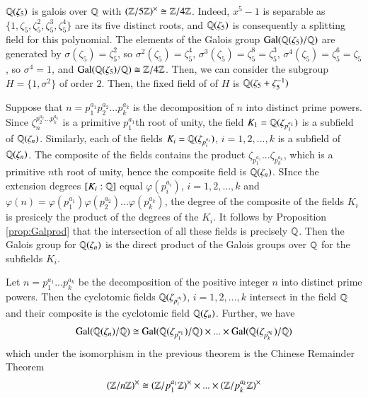 \documentclass[12pt, a4paper, oneside, openright, titlepage]{book}
\begin{document}
\begin{eg}
    $\mathbb Q(\zeta_5)$ is galois over $\mathbb Q$ with $(\mathbb Z/5\mathbb Z)^{\times} \cong \mathbb Z/4\mathbb Z$. Indeed, $x^5-1$ is separable as $\{1,\zeta_5,\zeta_5^2,\zeta_5^3,\zeta_5^4\}$ are its five distinct roots, and $\mathbb Q(\zeta_5)$ is consequently a splitting field for this polynomial. The elements of the Galois group $\text{Gal}(\mathbb Q(\zeta_5)/\mathbb Q)$ are generated by $\sigma(\zeta_5) = \zeta_5^2$, so $\sigma^2(\zeta_5) = \zeta_5^4$, $\sigma^3(\zeta_5) = \zeta_5^8 = \zeta_5^3$, $\sigma^4(\zeta_5) = \zeta_5^{6} = \zeta_5$, so $\sigma^4 = 1$, and $\text{Gal}(\mathbb Q(\zeta_5)/\mathbb Q) \cong \mathbb Z/4\mathbb Z$. Then, we can consider the subgroup $H = \{1,\sigma^2\}$ of order $2$. Then, the fixed field of of $H$ is $\mathbb Q(\zeta_5+\zeta_5^{-1})$
\end{eg}

Suppose that $n = p_1^{a_1}p_2^{a_2}...p_k^{a_k}$ is the decomposition of $n$ into distinct prime powers. Since $\zeta_n^{p_2^{a_2}...p_k^{a_k}}$ is a primitive $p_1^{a_1}$th root of unity, the field $K_1 = \mathbb Q(\zeta_{p_1^{a_1}})$ is a subfield of $\mathbb Q(\zeta_n)$. Similarly, each of the fields $K_i = \mathbb Q(\zeta_{p_i^{a_i}})$, $i = 1,2,...,k$ is a subfield of $\mathbb Q(\zeta_n)$. The composite of the fields contains the product $\zeta_{p_1^{a_1}}...\zeta_{p_k^{a_k}}$, which is a primitive $n$th root of unity, hence the composite field is $\mathbb Q(\zeta_n)$. SInce the extension degrees $[K_i:\mathbb Q]$ equal $\varphi(p_i^{a_i})$, $i=1,2,...,k$ and $\varphi(n) = \varphi(p_1^{a_1})\varphi(p_2^{a_2})...\varphi(p_k^{a_k})$, the degree of the composite of the fields $K_i$ is presicely the product of the degrees of the $K_i$. It follows by Proposition \ref{prop:Galprod} that the intersection of all these fields is precisely $\mathbb Q$. Then the Galois group for $\mathbb Q(\zeta_n)$ is the direct product of the Galois groups over $\mathbb Q$ for the subfields $K_i$.


\begin{cor}
    Let $n = p_1^{a_1}...p_k^{a_k}$ be the decomposition of the positive integer $n$ into distinct prime powers. Then the cyclotomic fields $\mathbb Q(\zeta_{p_i^{a_i}})$, $i = 1,2,...,k$ intersect in the field $\mathbb Q$ and their composite is the cyclotomic field $\mathbb Q(\zeta_n)$. Further, we have \begin{equation*}
        \text{Gal}(\mathbb Q(\zeta_n)/\mathbb Q)\cong \text{Gal}(\mathbb Q(\zeta_{p_1^{a_1}})/\mathbb Q)\times ...\times \text{Gal}(\mathbb Q(\zeta_{p_k^{a_k}})/\mathbb Q)
    \end{equation*}
    which under the isomorphism in the previous theorem is the Chinese Remainder Theorem\begin{equation*}
        (\mathbb Z/n\mathbb Z)^{\times} \cong (\mathbb Z/p_1^{a_1}\mathbb Z)^{\times}\times...\times (\mathbb Z/p_k^{a_k}\mathbb Z)^{\times}
    \end{equation*}
\end{cor}
\end{document}
